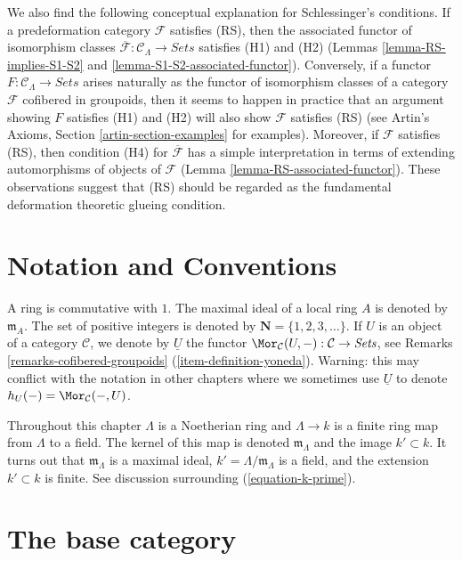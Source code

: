 \medskip\noindent
We also find the following conceptual explanation for Schlessinger's
conditions. If a predeformation category $\mathcal{F}$ satisfies (RS),
then the associated functor of isomorphism classes
$\overline{\mathcal{F}}: \mathcal{C}_\Lambda \to \textit{Sets}$
satisfies (H1) and (H2)
(Lemmas \ref{lemma-RS-implies-S1-S2} and
\ref{lemma-S1-S2-associated-functor}).
Conversely, if a functor
$F : \mathcal{C}_\Lambda \to \textit{Sets}$
arises naturally as the functor of isomorphism classes of
a category $\mathcal{F}$ cofibered in groupoids, then it seems to happen in
practice that an argument showing $F$ satisfies (H1) and (H2) will also show
$\mathcal{F}$ satisfies (RS) (see
Artin's Axioms, Section \ref{artin-section-examples}
for examples). Moreover, if $\mathcal{F}$ satisfies (RS), then condition
(H4) for $\overline{\mathcal{F}}$ has a simple interpretation in terms of
extending automorphisms of objects of $\mathcal{F}$
(Lemma \ref{lemma-RS-associated-functor}).
These observations suggest that (RS) should be regarded as the
fundamental deformation theoretic glueing condition.




\section{Notation and Conventions}
\label{section-notations-conventions}

\noindent
A ring is commutative with $1$. The  maximal ideal of a local ring $A$
is denoted by $\mathfrak{m}_A$. The set of positive integers is denoted
by $\mathbf{N} = \{1, 2, 3, \ldots\}$. If $U$ is an object of a
category $\mathcal{C}$, we denote by $\underline{U}$
the functor
$\Mor_\mathcal{C}(U, -): \mathcal{C} \to \textit{Sets}$, see
Remarks \ref{remarks-cofibered-groupoids} (\ref{item-definition-yoneda}).
Warning: this may conflict with the notation in other chapters where we
sometimes use $\underline{U}$ to denote $h_U(-) = \Mor_\mathcal{C}(-, U)$.

\medskip\noindent
Throughout this chapter $\Lambda$ is a Noetherian ring and
$\Lambda \to k$ is a finite ring map from $\Lambda$ to a field.
The kernel of this map is denoted $\mathfrak m_\Lambda$ and the
image $k' \subset k$. It turns out that $\mathfrak m_\Lambda$ is
a maximal ideal, $k' = \Lambda/\mathfrak m_\Lambda$ is a field, and
the extension $k' \subset k$ is finite. See discussion surrounding
(\ref{equation-k-prime}).


\section{The base category}
\label{section-CLambda}

